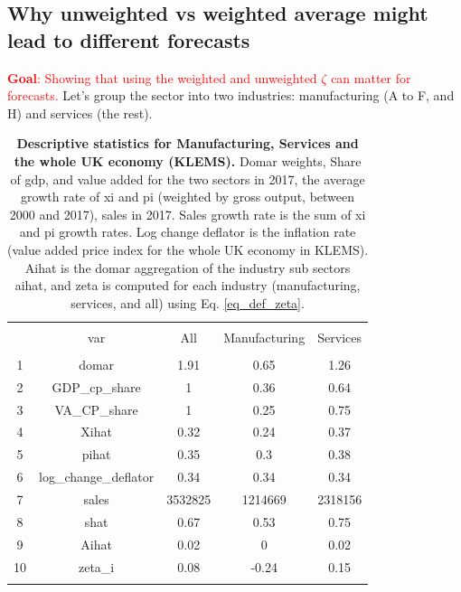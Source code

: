 \documentclass[11pt]{article}
\begin{document}
\newpage

\subsection{Why unweighted vs weighted average might lead to different forecasts}

\textcolor{red}{\textbf{Goal}: Showing that using the weighted and unweighted $\zeta$ can matter for forecasts.}
Let's group the sector into two industries: manufacturing (A to F, and H) and services (the rest).

\begin{table}[!htbp] \centering 
  \caption{\textbf{Descriptive statistics for Manufacturing, Services and the whole UK economy (KLEMS).} \footnotesize Domar weights, Share of gdp, and value added for the two sectors in 2017, the average growth rate of xi and pi (weighted by gross output, between 2000 and 2017), sales in 2017. Sales growth rate is the sum of xi and pi growth rates. Log change deflator is the inflation rate (value added price index for the whole UK economy in KLEMS). Aihat is the domar aggregation of the industry sub sectors aihat, and zeta is computed for each industry (manufacturing, services, and all) using Eq. \ref{eq_def_zeta}.} 
  \label{} 
\begin{tabular}{@{\extracolsep{5pt}} ccccc} 
\\[-1.8ex]\hline 
\hline \\[-1.8ex] 
 & var & All & Manufacturing & Services \\ 
\hline \\[-1.8ex] 
1 & domar & 1.91 & 0.65 & 1.26 \\ 
2 & GDP\_cp\_share & 1 & 0.36 & 0.64 \\ 
3 & VA\_CP\_share & 1 & 0.25 & 0.75 \\ 
4 & Xihat & 0.32 & 0.24 & 0.37 \\ 
5 & pihat & 0.35 & 0.3 & 0.38 \\ 
6 & log\_change\_deflator & 0.34 & 0.34 & 0.34 \\ 
7 & sales & 3532825 & 1214669 & 2318156 \\ 
8 & shat & 0.67 & 0.53 & 0.75 \\ 
9 & Aihat & 0.02 & 0 & 0.02 \\ 
10 & zeta\_i & 0.08 & -0.24 & 0.15 \\ 
\hline \\[-1.8ex] 
\end{tabular} 
\end{table} 
\end{document}
